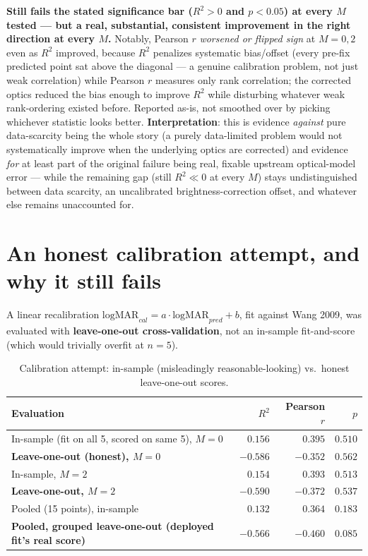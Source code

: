 \textbf{Still fails the stated significance bar ($R^2>0$ and $p<0.05$) at every $M$
tested --- but a real, substantial, consistent improvement in the right direction at
every $M$.} Notably, Pearson $r$ \emph{worsened or flipped sign} at $M=0,2$ even as
$R^2$ improved, because $R^2$ penalizes systematic bias/offset (every pre-fix predicted
point sat above the diagonal --- a genuine calibration problem, not just weak
correlation) while Pearson $r$ measures only rank correlation; the corrected optics
reduced the bias enough to improve $R^2$ while disturbing whatever weak rank-ordering
existed before. Reported as-is, not smoothed over by picking whichever statistic looks
better. \textbf{Interpretation}: this is evidence \emph{against} pure data-scarcity
being the whole story (a purely data-limited problem would not systematically improve
when the underlying optics are corrected) and evidence \emph{for} at least part of the
original failure being real, fixable upstream optical-model error --- while the
remaining gap (still $R^2\ll0$ at every $M$) stays undistinguished between data
scarcity, an uncalibrated brightness-correction offset, and whatever else remains
unaccounted for.

\section{An honest calibration attempt, and why it still fails}

A linear recalibration $\text{logMAR}_{cal}=a\cdot\text{logMAR}_{pred}+b$, fit against
Wang 2009, was evaluated with \textbf{leave-one-out cross-validation}, not an in-sample
fit-and-score (which would trivially overfit at $n=5$).

\begin{table}[htbp]
\centering
\begin{tabular}{lrrr}
\toprule
Evaluation & $R^2$ & Pearson $r$ & $p$ \\
\midrule
In-sample (fit on all 5, scored on same 5), $M=0$ & $0.156$ & $0.395$ & $0.510$ \\
\textbf{Leave-one-out (honest), $M=0$} & $\mathbf{-0.586}$ & $\mathbf{-0.352}$ & $0.562$ \\
In-sample, $M=2$ & $0.154$ & $0.393$ & $0.513$ \\
\textbf{Leave-one-out, $M=2$} & $\mathbf{-0.590}$ & $\mathbf{-0.372}$ & $0.537$ \\
Pooled (15 points), in-sample & $0.132$ & $0.364$ & $0.183$ \\
\textbf{Pooled, grouped leave-one-out (deployed fit's real score)} & $\mathbf{-0.566}$ & $\mathbf{-0.460}$ & $\mathbf{0.085}$ \\
\bottomrule
\end{tabular}
\caption{Calibration attempt: in-sample (misleadingly reasonable-looking) vs.\ honest leave-one-out scores.}
\label{tab:calibration-loo}
\end{table}


